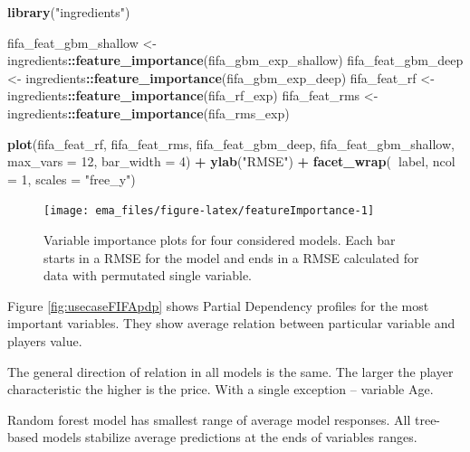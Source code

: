 \documentclass[12pt,]{krantz}
\newenvironment{Shaded}{\begin{snugshade}}{\end{snugshade}}
\newcommand{\DataTypeTok}[1]{\textcolor[rgb]{0.13,0.29,0.53}{#1}}
\newcommand{\DecValTok}[1]{\textcolor[rgb]{0.00,0.00,0.81}{#1}}
\newcommand{\KeywordTok}[1]{\textcolor[rgb]{0.13,0.29,0.53}{\textbf{#1}}}
\newcommand{\NormalTok}[1]{#1}
\newcommand{\OperatorTok}[1]{\textcolor[rgb]{0.81,0.36,0.00}{\textbf{#1}}}
\newcommand{\StringTok}[1]{\textcolor[rgb]{0.31,0.60,0.02}{#1}}
\begin{document}
\begin{Shaded}
\begin{Highlighting}[]
\KeywordTok{library}\NormalTok{(}\StringTok{"ingredients"}\NormalTok{)}

\NormalTok{fifa_feat_gbm_shallow <-}\StringTok{ }\NormalTok{ingredients}\OperatorTok{::}\KeywordTok{feature_importance}\NormalTok{(fifa_gbm_exp_shallow)}
\NormalTok{fifa_feat_gbm_deep <-}\StringTok{ }\NormalTok{ingredients}\OperatorTok{::}\KeywordTok{feature_importance}\NormalTok{(fifa_gbm_exp_deep)}
\NormalTok{fifa_feat_rf <-}\StringTok{ }\NormalTok{ingredients}\OperatorTok{::}\KeywordTok{feature_importance}\NormalTok{(fifa_rf_exp)}
\NormalTok{fifa_feat_rms <-}\StringTok{ }\NormalTok{ingredients}\OperatorTok{::}\KeywordTok{feature_importance}\NormalTok{(fifa_rms_exp)}

\KeywordTok{plot}\NormalTok{(fifa_feat_rf, fifa_feat_rms, }
\NormalTok{     fifa_feat_gbm_deep, fifa_feat_gbm_shallow, }
     \DataTypeTok{max_vars =} \DecValTok{12}\NormalTok{, }\DataTypeTok{bar_width =} \DecValTok{4}\NormalTok{) }\OperatorTok{+}\StringTok{ }\KeywordTok{ylab}\NormalTok{(}\StringTok{"RMSE"}\NormalTok{) }\OperatorTok{+}\StringTok{ }\KeywordTok{facet_wrap}\NormalTok{(}\OperatorTok{~}\NormalTok{label, }\DataTypeTok{ncol =} \DecValTok{1}\NormalTok{, }\DataTypeTok{scales =} \StringTok{"free_y"}\NormalTok{)}
\end{Highlighting}
\end{Shaded}

\begin{figure}

{\centering \texttt{[image: ema\_files/figure-latex/featureImportance-1]} 

}

\caption{Variable importance plots for four considered models. Each bar starts in a RMSE for the model and ends in a RMSE calculated for data with permutated single variable.}\label{fig:featureImportance}
\end{figure}

Figure \ref{fig:usecaseFIFApdp} shows Partial Dependency profiles for the most important variables. They show average relation between particular variable and players value.

The general direction of relation in all models is the same. The larger the player characteristic the higher is the price. With a single exception -- variable Age.

Random forest model has smallest range of average model responses. All tree-based models stabilize average predictions at the ends of variables ranges.
\end{document}
